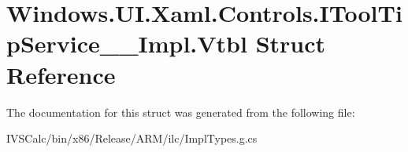 \hypertarget{struct_windows_1_1_u_i_1_1_xaml_1_1_controls_1_1_i_tool_tip_service_____impl_1_1_vtbl}{}\section{Windows.\+U\+I.\+Xaml.\+Controls.\+I\+Tool\+Tip\+Service\+\_\+\+\_\+\+Impl.\+Vtbl Struct Reference}
\label{struct_windows_1_1_u_i_1_1_xaml_1_1_controls_1_1_i_tool_tip_service_____impl_1_1_vtbl}


The documentation for this struct was generated from the following file\+:\begin{DoxyCompactItemize}
\item 
I\+V\+S\+Calc/bin/x86/\+Release/\+A\+R\+M/ilc/Impl\+Types.\+g.\+cs\end{DoxyCompactItemize}

